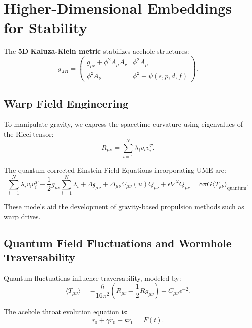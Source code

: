 \documentclass{article}
\theoremstyle{plain}
\begin{document}
\section{Higher-Dimensional Embeddings for Stability}
The \textbf{5D Kaluza-Klein metric} stabilizes acehole structures:
\begin{equation}
g_{AB} =
\begin{pmatrix}
g_{\mu\nu} + \phi^2 A_{\mu} A_{\nu} & \phi^2 A_{\mu} \\
\phi^2 A_{\nu} & \phi^2 + \psi(s, p, d, f)
\end{pmatrix}.
\end{equation}

\subsection{Warp Field Engineering}

To manipulate gravity, we express the spacetime curvature using eigenvalues of the Ricci tensor:
\begin{equation}
R_{\mu\nu} = \sum_{i=1}^{N} \lambda_i v_i v_i^T.
\end{equation}

The quantum-corrected Einstein Field Equations incorporating UME are:
\begin{equation}
\sum_{i=1}^{N} \lambda_i v_i v_i^T - \frac{1}{2} g_{\mu\nu} \sum_{i=1}^{N} \lambda_i + \Lambda g_{\mu\nu} + \Delta_{\mu\nu} \Omega_{\mu\nu} (u) Q_{\mu\nu} + \epsilon \nabla^2 Q_{\mu\nu} = 8 \pi G \langle T_{\mu\nu} \rangle_{\text{quantum}}.
\end{equation}

These models aid the development of gravity-based propulsion methods such as warp drives.

\subsection{Quantum Field Fluctuations and Wormhole Traversability}
Quantum fluctuations influence traversability, modeled by:
\begin{equation}
\langle T_{\mu\nu} \rangle = - \frac{\hbar}{16\pi^2} \left( R_{\mu\nu} - \frac{1}{2} R g_{\mu\nu} \right) + C_{\mu\nu} \epsilon^{-2}.
\end{equation}

The acehole throat evolution equation is:
\begin{equation}
\ddot{r}_0 + \gamma \dot{r}_0 + \kappa r_0 = F(t).
\end{equation}
\end{document}

